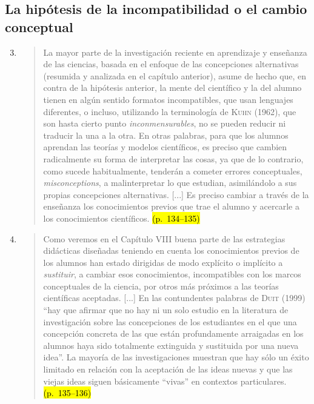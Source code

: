 \documentclass{article}
\begin{document}
\subsection*{La hipótesis de la incompatibilidad o el cambio conceptual}

\begin{enumerate}
  \setcounter{enumi}{2}

  \item
  \begin{quote}
  La mayor parte de la investigación reciente en aprendizaje y enseñanza de las ciencias, basada en el enfoque de las concepciones alternativas (resumida y analizada en el capítulo anterior), asume de hecho que, en contra de la hipótesis anterior, la mente del científico y la del alumno tienen en algún sentido formatos incompatibles, que usan lenguajes diferentes, o incluso, utilizando la terminología de \textsc{Kuhn} (1962), que son hasta cierto punto \textit{inconmensurables}, no se pueden reducir ni traducir la una a la otra. En otras palabras, para que los alumnos aprendan las teorías y modelos científicos, es preciso que cambien radicalmente su forma de interpretar las cosas, ya que de lo contrario, como sucede habitualmente, tenderán a cometer errores conceptuales, \textit{misconceptions}, a malinterpretar lo que estudian, asimilándolo a sus propias concepciones alternativas. [...] Es preciso cambiar a través de la enseñanza los conocimientos previos que trae el alumno y acercarle a los conocimientos científicos. \hl{(p.~134–135)}
  \end{quote}

  \item
  \begin{quote}
  Como veremos en el Capítulo VIII buena parte de las estrategias didácticas diseñadas teniendo en cuenta los conocimientos previos de los alumnos han estado dirigidas de modo explícito o implícito a \textit{sustituir}, a cambiar esos conocimientos, incompatibles con los marcos conceptuales de la ciencia, por otros más próximos a las teorías científicas aceptadas. [...] En las contundentes palabras de \textsc{Duit} (1999) “hay que afirmar que no hay ni un solo estudio en la literatura de investigación sobre las concepciones de los estudiantes en el que una concepción concreta de las que están profundamente arraigadas en los alumnos haya sido totalmente extinguida y sustituida por una nueva idea”. La mayoría de las investigaciones muestran que hay sólo un éxito limitado en relación con la aceptación de las ideas nuevas y que las viejas ideas siguen básicamente “vivas” en contextos particulares. \hl{(p.~135–136)}
  \end{quote}
\end{enumerate}
\end{document}
